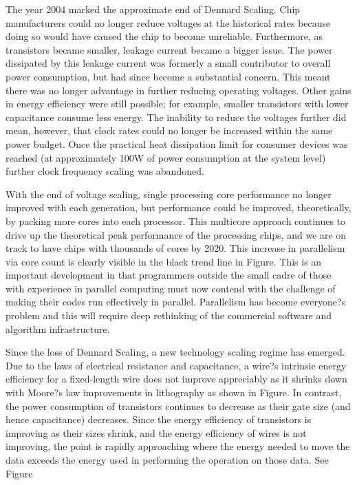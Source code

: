 The year 2004 marked the approximate end of Dennard Scaling. Chip manufacturers could no longer reduce voltages at the historical rates because doing so would have caused the chip to become unreliable. Furthermore, as transistors became smaller, leakage current became a bigger issue. The power dissipated by this leakage current was formerly a small contributor to overall power consumption, but had since become a substantial concern. This meant there was no longer advantage in further reducing operating voltages. Other gains in energy efficiency were still possible; for example, smaller transistors with lower capacitance consume less energy. The inability to reduce the voltages further did mean, however, that clock rates could no longer be increased within the same power budget. Once the practical heat dissipation limit for consumer devices was reached (at approximately 100W of power consumption at the system level) further clock frequency scaling was abandoned.  %

With the end of voltage scaling, single processing core performance no longer improved with each generation, but performance could be improved, theoretically, by packing more cores into each processor. This multicore approach continues to drive up the theoretical peak performance of the processing chips, and we are on track to have chips with thousands of cores by 2020.  This increase in parallelism via core count is clearly visible in the black trend line in Figure.  This is an important development in that programmers outside the small cadre of those with experience in parallel computing must now contend with the challenge of making their codes run effectively in parallel. Parallelism has become everyone?s problem and this will require deep rethinking of the commercial software and algorithm infrastructure. 

Since the loss of Dennard Scaling, a new technology scaling regime has emerged. Due to the laws of electrical resistance and capacitance, a wire?s intrinsic energy efficiency for a fixed-length wire does not improve appreciably as it shrinks down with Moore?s law improvements in lithography as shown in Figure. In contrast, the power consumption of transistors continues to decrease as their gate size (and hence capacitance) decreases. Since the energy efficiency of transistors is improving as their sizes shrink, and the energy efficiency of wires is not improving, the point is rapidly approaching where the energy needed to move the data exceeds the energy used in performing the operation on those data.  See Figure

